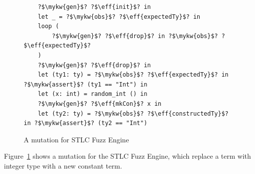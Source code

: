 \begin{figure}[h!]
    \centering
    \begin{verbatim}
    ?$\mykw{gen}$? ?$\eff{init}$? in
    let _ = ?$\mykw{obs}$? ?$\eff{expectedTy}$? in
    loop (
        ?$\mykw{gen}$? ?$\eff{drop}$? in ?$\mykw{obs}$? ?$\eff{expectedTy}$?
    )
    ?$\mykw{gen}$? ?$\eff{drop}$? in
    let (ty1: ty) = ?$\mykw{obs}$? ?$\eff{expectedTy}$? in ?$\mykw{assert}$? (ty1 == "Int") in
    let (x: int) = random_int () in
    ?$\mykw{gen}$? ?$\eff{mkCon}$? x in
    let (ty2: ty) = ?$\mykw{obs}$? ?$\eff{constructedTy}$? in ?$\mykw{assert}$? (ty2 == "Int")
    \end{verbatim}
    \caption{A mutation for STLC Fuzz Engine }\label{fig:stlc-fuzz-engine-gen}
\end{figure}
    
Figure~\ref{fig:stlc-fuzz-engine-gen} shows a mutation for the STLC Fuzz Engine, which replace a term with integer type with a new constant term.